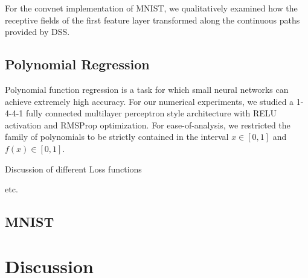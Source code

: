 \documentclass[twocolumn,superscriptaddress,aps,prb,floatfix]{revtex4-1}
\begin{document}
For the convnet implementation of MNIST, we qualitatively examined how the receptive fields of the first feature layer transformed along the continuous paths provided by DSS.


\subsection{Polynomial Regression}
\label{sec:PolyFuncs}

 Polynomial function regression is a task for which small neural networks can achieve extremely high accuracy.  For our numerical experiments, we studied a 1-4-4-1 fully connected multilayer perceptron style architecture with RELU activation and RMSProp optimization.  For ease-of-analysis, we restricted the family of polynomials to be strictly contained in the interval $x\in[0,1]$ and $f(x)\in[0,1]$.
 
 Discussion of different Loss functions
 
 etc.


\subsection{MNIST}
\label{sec:MNIST}


\section{Discussion}
\label{sec:Discussion}

 
 


\end{document}

